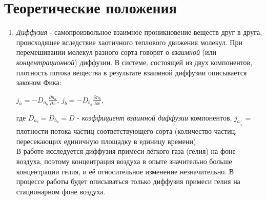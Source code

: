 \documentclass{article}
\begin{document}
\section{Теоретические положения}
\begin{enumerate}
\item {\sl Диффузия} - самопроизвольное взаимное проникновение веществ друг в друга, происходящее вследствие хаотичного теплового движения молекул. При перемешивании молекул разного сорта говорят о {\sl взаимной} (или {\sl концентрационной}) диффузии.
В системе, состоящей из двух компонентов, плотность потока вещества в результате взаимной диффузии описывается законом Фика:
\begin{center}
$j_a = -D_a_b\frac{\partial n_a}{\partial x}$, $j_b = -D_b_a\frac{\partial n_b}{\partial x}$,
\end{center}
где $D_a_b = D_b_a = D$ - {\sl коэффициент взаимной диффузии} компонентов, $j_a_,_b$ = плотности потока частиц соответствующего сорта (количество частиц, пересекающих единичную площадку в единицу времени).\\
В работе исследуется диффузия примеси лёгкого газа (гелия) на фоне воздуха, поэтому концентрация воздуха в опыте значительно больше концентрации гелия, и её относительное изменение незначительно. В процессе работы будет описываться только диффузия примеси гелия на стационарном фоне воздуха.\\


\end{enumerate}
\end{document}
